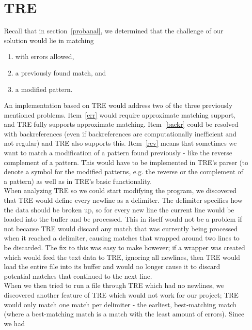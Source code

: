 \section{TRE}\label{tre}
Recall that in section~\ref{probanal}, we determined that the challenge of our 
solution would lie in matching
\begin{enumerate}
\item \label{err} with errors allowed,
\item \label{backr} a previously found match, and 
\item \label{rev} a modified pattern.
\end{enumerate}
An implementation based on TRE would address two of the three previously mentioned 
problems. Item~\ref{err} would require approximate matching support, and 
TRE fully supports approximate matching. Item~\ref{backr} could be resolved 
with backreferences (even if backreferences are computationally inefficient and not regular) 
and TRE also supports this. Item~\ref{rev} means that sometimes we want to 
match a modification of a pattern found previously - like the reverse 
complement of a pattern. This would have to be implemented in TRE's parser 
(to denote a symbol for the modified patterns, e.g. the reverse or the 
complement of a pattern) as 
well as in TRE's basic functionality.\\
When analyzing TRE so we could start modifying the 
program, we discovered that TRE would define every newline as a delimiter. The 
delimiter specifies how the data should be broken up, so for every new line 
the current line would be loaded into the buffer and be processed. This in 
itself would not be a problem if not because TRE would discard any match that 
was currently being processed when it reached a delimiter, causing matches that 
wrapped around two lines to be discarded. The fix to this was easy to make 
however; if a wrapper was created which would feed the text data to TRE, 
ignoring all newlines, then TRE would load the entire file into its buffer 
and would no longer cause it to discard potential matches that continued to 
the next line.\\
When we then tried to run a file through TRE which had no newlines, we discovered 
another feature of TRE which would not work for our project; TRE would only 
match one match per delimiter - the earliest, best-matching match (where a 
best-matching match is a match with the least amount of errors). Since we had 
